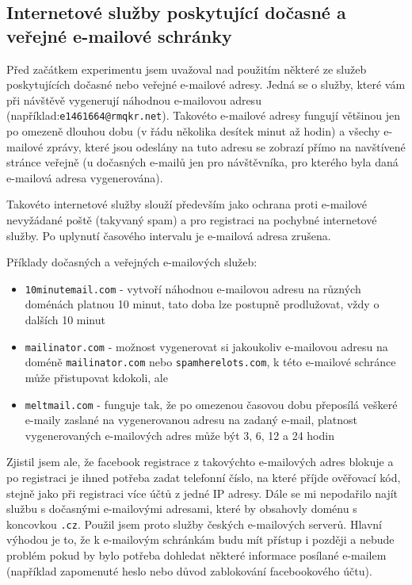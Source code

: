\documentclass[thesis=M,czech]{FITthesis}[2013/05/10]
\begin{document}
\subsection{Internetové služby poskytující dočasné a veřejné e-mailové schránky}

Před začátkem experimentu jsem uvažoval nad použitím některé ze služeb poskytujících dočasné nebo veřejné e-mailové adresy. Jedná se o služby, které vám při návštěvě vygenerují náhodnou e-mailovou adresu (například:\newline \verb|e1461664@rmqkr.net|). Takovéto e-mailové adresy fungují většinou jen po omezeně dlouhou dobu (v řádu několika desítek minut až hodin) a všechy e-mailové zprávy, které jsou odeslány na tuto adresu se zobrazí přímo na navštívené stránce veřejně (u dočasných e-mailů jen pro návštěvníka, pro kterého byla daná e-mailová adresa vygenerována).

Takovéto internetové služby slouží především jako ochrana proti e-mailové nevyžádané poště (takyvaný spam) a pro registraci na pochybné internetové služby. Po uplynutí časového intervalu je e-mailová adresa zrušena.

Příklady dočasných a veřejných e-mailových služeb:

\begin{itemize}
  \item \verb|10minutemail.com| - vytvoří náhodnou e-mailovou adresu na různých doménách platnou 10 minut, tato doba lze postupně prodlužovat, vždy o dalších 10 minut
  \item \verb|mailinator.com| - možnost vygenerovat si jakoukoliv e-mailovou adresu na doméně \verb|mailinator.com| nebo \verb|spamherelots.com|, k této e-mailové schránce může přistupovat kdokoli, ale 
  \item \verb|meltmail.com| - funguje tak, že po omezenou časovou dobu přeposílá veškeré e-maily zaslané na vygenerovanou adresu na zadaný e-mail, platnost vygenerovaných e-mailových adres může být 3, 6, 12 a 24 hodin
\end{itemize}

Zjistil jsem ale, že facebook registrace z takovýchto e-mailových adres blokuje a po registraci je ihned potřeba zadat telefonní číslo, na které příjde ověřovací kód, stejně jako při registraci více účtů z jedné IP adresy. Dále se mi nepodařilo najít službu s dočasnými e-mailovými adresami, které by obsahovly doménu s koncovkou \verb|.cz|. Použil jsem proto služby českých e-mailových serverů. Hlavní výhodou je to, že k e-mailovým schránkám budu mít přístup i později a nebude problém pokud by bylo potřeba dohledat některé informace posílané e-mailem (například zapomenuté heslo nebo důvod zablokování facebookového účtu).
\end{document}
